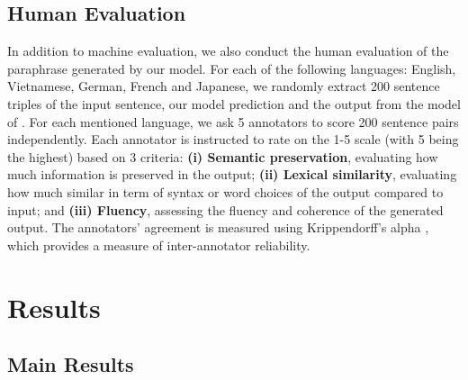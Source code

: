 \documentclass[letterpaper]{article} %
\begin{document}
\subsection{Human Evaluation}
In addition to machine evaluation, we also conduct the human evaluation of the paraphrase generated by our model. For each of the following languages: English, Vietnamese, German, French and Japanese, we randomly extract 200 sentence triples of the input sentence, our model prediction and the output from the model of \citet{thompson-post-2020-paraphrase}. For each mentioned language, we ask 5 annotators to score 200 sentence pairs independently. Each annotator is instructed to rate on the 1-5 scale (with 5 being the highest) based on 3 criteria: \textbf{(i) Semantic preservation}, evaluating how much information is preserved in the output; \textbf{(ii) Lexical similarity}, evaluating how much similar in term of syntax or word choices of the output compared to input; and \textbf{(iii) Fluency}, assessing the fluency and coherence of the generated output. The annotators' agreement is measured using Krippendorff's alpha \citep{Krippendorff1970EstimatingTR}, which provides a measure of inter-annotator reliability.

\section{Results}
\subsection{Main Results}
\end{document}
